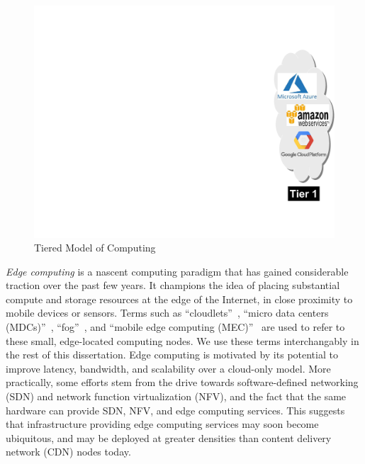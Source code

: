 \begin{figure}[t]
\begin{minipage}[c]{2.7in}
    \end{minipage}
    \begin{minipage}[c]{1in}
        \includegraphics[scale=0.45]{FIGS/fig-3tier-C.pdf}
    \end{minipage}
    \centering
    \caption{Tiered Model of Computing}
    \label{fig:3tier}
\end{figure}

{\em Edge computing} is a nascent computing paradigm that has gained
considerable traction over the past few years. It champions the idea of placing
substantial compute and storage resources at the edge of the Internet, in close
proximity to mobile devices or sensors.  Terms such as
``cloudlets''~\cite{Satya2009}, ``micro data centers (MDCs)''~\cite{bahl2015emergence},
``fog''~\cite{Bonomi2012}, and ``mobile edge computing (MEC)''~\cite{Brown2013}
are used to refer to these small, edge-located computing nodes.  We use these
terms interchangably in the rest of this dissertation. Edge computing is motivated by
its potential to improve latency, bandwidth, and scalability over a cloud-only
model.  More practically, some efforts stem from the drive towards
software-defined networking (SDN) and network function virtualization (NFV), and
the fact that the same hardware can provide SDN, NFV, and edge computing
services. This suggests that infrastructure providing edge computing services
may soon become ubiquitous, and may be deployed at greater densities than
content delivery network (CDN) nodes today.


